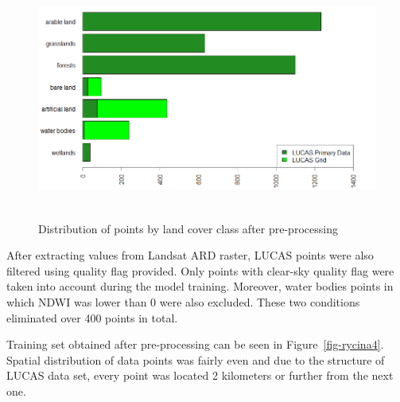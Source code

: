 \documentclass{amuthesis}
\begin{document}
\begin{figure}[H]

{\centering \includegraphics[width=5.75in,height=3.125in]{./figures/lucas_data.png}

}

\caption{\label{fig-rycina3}Distribution of points by land cover class
after pre-processing}

\end{figure}

After extracting values from Landsat ARD raster, LUCAS points were also
filtered using quality flag provided. Only points with clear-sky quality
flag were taken into account during the model training. Moreover, water
bodies points in which NDWI was lower than 0 were also excluded. These
two conditions eliminated over 400 points in total.

Training set obtained after pre-processing can be seen in
Figure~\ref{fig-rycina4}. Spatial distribution of data points was fairly
even and due to the structure of LUCAS data set, every point was located
2 kilometers or further from the next one.
\end{document}
